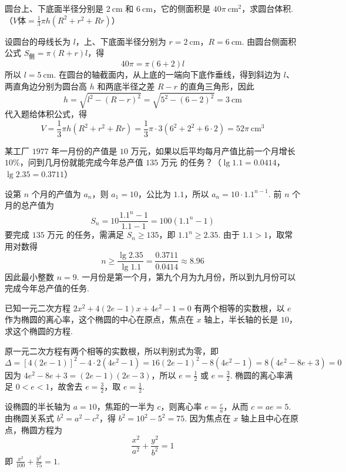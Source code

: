 \begin{problem}
圆台上、下底面半径分别是 \(2 \mathrm{~cm}\) 和 \(6 \mathrm{~cm}\)，它的侧面积是 \(40\pi \mathrm{~cm}^2\)，求圆台体积.（\(V\text{体}=\frac{1}{3}\pi h\left(R^2+r^2+Rr\right)\)）
\end{problem}

\begin{solution}
设圆台的母线长为 \(l\)，上、下底面半径分别为 \(r=2 \mathrm{~cm}\)，\(R=6 \mathrm{~cm}\). 由圆台侧面积公式 \(S_{\text{侧}}=\pi\left(R+r\right)l\)，得
\[
40\pi=\pi\left(6+2\right)l
\]
所以 \(l=5 \mathrm{~cm}\). 在圆台的轴截面内，从上底的一端向下底作垂线，得到斜边为 \(l\)、两直角边分别为圆台高 \(h\) 和两底半径之差 \(R-r\) 的直角三角形，因此
\[
h=\sqrt{l^2-\left(R-r\right)^2}=\sqrt{5^2-\left(6-2\right)^2}=3 \mathrm{~cm}
\]
代入题给体积公式，得
\[
V=\frac{1}{3}\pi h\left(R^2+r^2+Rr\right)=\frac{1}{3}\pi\cdot3\left(6^2+2^2+6\cdot2\right)=52\pi \mathrm{~cm}^3
\]
\end{solution}

\begin{problem}
某工厂 \(1977\) 年一月份的产值是 \(10 \text{ 万元}\)，如果以后平均每月产值比前一个月增长 \(10\%\)，问到几月份就能完成今年总产值 \(135 \text{ 万元}\) 的任务？（\(\lg 1.1=0.0414\)，\(\lg 2.35=0.3711\)）
\end{problem}

\begin{solution}
设第 \(n\) 个月的产值为 \(a_n\)，则 \(a_1=10\)，公比为 \(1.1\)，所以 \(a_n=10\cdot1.1^{n-1}\). 前 \(n\) 个月的总产值为
\[
S_n=10\frac{1.1^n-1}{1.1-1}=100\left(1.1^n-1\right)
\]
要完成 \(135\text{ 万元}\) 的任务，需满足 \(S_n\geqslant135\)，即 \(1.1^n\geqslant2.35\). 由于 \(1.1>1\)，取常用对数得
\[
n\geqslant\frac{\lg2.35}{\lg1.1}=\frac{0.3711}{0.0414}\approx8.96
\]
因此最小整数 \(n=9\). 一月份是第一个月，第九个月为九月份，所以到九月份可以完成今年总产值的任务.
\end{solution}

\begin{problem}
已知一元二次方程 \(2x^2+4\left(2e-1\right)x+4e^2-1=0\) 有两个相等的实数根，以 \(e\) 作为椭圆的离心率，这个椭圆的中心在原点，焦点在 \(x\) 轴上，半长轴的长是 \(10\)，求这个椭圆的方程.
\end{problem}

\begin{solution}
原一元二次方程有两个相等的实数根，所以判别式为零，即
\[
\Delta=\left[4\left(2e-1\right)\right]^2-4\cdot2\left(4e^2-1\right)
=16\left(2e-1\right)^2-8\left(4e^2-1\right)
=8\left(4e^2-8e+3\right)=0
\]
因为 \(4e^2-8e+3=(2e-1)(2e-3)\)，所以 \(e=\frac{1}{2}\) 或 \(e=\frac{3}{2}\). 椭圆的离心率满足 \(0<e<1\)，故舍去 \(e=\frac{3}{2}\)，取 \(e=\frac{1}{2}\).

设椭圆的半长轴为 \(a=10\)，焦距的一半为 \(c\)，则离心率 \(e=\frac{c}{a}\)，从而 \(c=ae=5\). 由椭圆关系式 \(b^2=a^2-c^2\)，得 \(b^2=10^2-5^2=75\). 因为焦点在 \(x\) 轴上且中心在原点，椭圆方程为
\[
\frac{x^2}{a^2}+\frac{y^2}{b^2}=1
\]
即 \(\frac{x^2}{100}+\frac{y^2}{75}=1\).
\end{solution}

